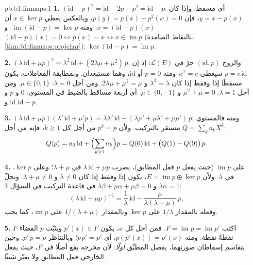 \begin{solution}{pb:b1:linmaps:1}
\textbf{1.} $(\mathrm{id} - p)^2 = \mathrm{id} - 2p + p^2 =
\mathrm{id} - p$: أي مسقط. وإذا كان $y = x - p(x)$، فإن $p(y) =
p(x) - p^2(x) = 0$، وبالعكس يعطي $x \in \ker p$ أن $x =
(\mathrm{id} - p)(x)$: ومنه $\operatorname{im}(\mathrm{id} - p) = \ker
p$. و $(\mathrm{id} - p)(x) = 0 \iff p(x) = x \iff x \in
\operatorname{im} p$ (بالنقاط الصامدة،
\cref{thm:b1:linmaps:projchar}): $\ker(\mathrm{id} - p) =
\operatorname{im} p$.

\textbf{2.} $(\lambda\,\mathrm{id} + \mu p)^2 =
\lambda^2\,\mathrm{id} + (2\lambda\mu + \mu^2)\,p$. والزوج
$(\mathrm{id}, p)$ حرّ في $\mathcal{L}(E)$: إذ إن $p = c\,
\mathrm{id}$ سيعطي $c^2 = c$، ومنه $p = 0$ أو $\mathrm{id}$،
وهما مستبعدان. وبمطابقة المعاملات، يكون  مسقطًا إذا وفقط إذا كان
$\lambda^2 = \lambda$ و $2\lambda\mu + \mu^2 = \mu$. ومن أجل
$\lambda = 0$: $\mu \in \{0, 1\}$. ومن أجل $\lambda = 1$: $\mu^2 +
\mu = 0$ و $\mu \in \{0, -1\}$. أي أربعة مساقط بالضبط في
المستوي: $0$ و $p$ و $\mathrm{id}$ و $\mathrm{id} - p$.

\textbf{3.} $(\lambda\,\mathrm{id} + \mu p)(\lambda'\,\mathrm{id}
+ \mu' p) = \lambda\lambda'\,\mathrm{id} + (\lambda\mu' +
\mu\lambda' + \mu\mu')\,p$: ومنه فالمستوي مستقر بالتركيب.
ولأن $p^k = p$ من أجل كل $k \geq 1$، فإنه من أجل $Q =
\sum_k a_k X^k$:
\[
Q(p) = a_0\,\mathrm{id} + \Bigl(\sum_{k \geq 1} a_k\Bigr) p
= Q(0)\,\mathrm{id} + \bigl(Q(1) - Q(0)\bigr)\,p .
\]

\textbf{4.} على $\operatorname{im} p$ (حيث يفعل $p$ فعل
 المطابق)، يضرب $\lambda\,\mathrm{id} + \mu p$ في $\lambda
+ \mu$؛ وعلى $\ker p$، في $\lambda$. ولأن $E = \operatorname{im} p
\oplus \ker p$، يكون   إذا وفقط إذا كان $\lambda \neq 0$ و
$\lambda + \mu \neq 0$. وبحلّ $\lambda\alpha = 1$ و
$\lambda\beta + \mu\alpha + \mu\beta = 0$ في قاعدة التركيب
في السؤال 3:
\[
(\lambda\,\mathrm{id} + \mu p)^{-1}
= \frac1\lambda\,\mathrm{id} -
\frac{\mu}{\lambda(\lambda + \mu)}\,p ,
\]
وفعله بالمقدار $1/\lambda$ على $\ker p$ وبالمقدار $1/(\lambda +
\mu)$ على $\operatorname{im} p$، كما يجب.

\textbf{5.} اكتب $F = \operatorname{im} p = \operatorname{im}
p'$. فمن أجل كل $x$، يكون $p'(x) \in F$ ويثبّت $p$ الفضاءَ $F$ نقطةً نقطة:
ومنه $p(p'(x)) = p'(x)$، أي $p\,p' = p'$؛ وبالتناظر $p'\,p =
p$. وحين يتقاسم إسقاطان صورتهما، يفصل المطبَّق
\emph{أولًا}: لأن مخرجه يقع أصلًا في $F$، حيث يفعل 
الخارجي فعل  المطابق ولا يغيّر شيئًا.


\end{solution}
